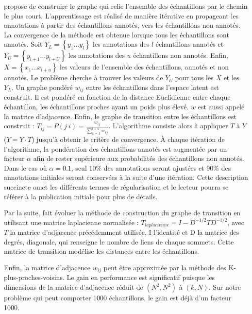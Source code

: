 \cite{zhu_learning_2002} propose de construire le graphe qui relie l'ensemble des échantillons par le chemin le plus court.
L'apprentissage est réalisé de manière itérative en propageant les annotations à partir des échantillons annotés, vers les échantillons non annotés.
La convergence de la méthode est obtenue lorsque tous les échantillons sont annotés.
Soit $Y_{L}=\left\{y_{1} \ldots y_{l}\right\}$ les annotations des $l$ échantillons annotés et $Y_{U}=\left\{y_{l+1} \ldots y_{l+U}\right\}$ les annotations des $u$ échantillons non annotés.
Enfin, $X=\left\{x_{1} \ldots x_{l+u}\right\}$ les valeurs de l'ensemble des échantillons, annotés et non annotés.
Le problème cherche à trouver les valeurs de $Y_{U}$ pour tous les $X$ et les $Y_{L}$.
Un graphe pondéré $w_{ij}$ entre les échantillons dans l'espace latent est construit. Il est pondéré en fonction de la distance Euclidienne entre chaque échantillon, les échantillons proches ayant un poids plus élevé.
$w$ est aussi appelé la matrice d'adjacence.
Enfin, le graphe de transition entre les échantillons est construit : $T_{i j}=P(j \ i)=\frac{w_{i j}}{\sum_{k=1}^{l+u} w_{k j}}$.
L'algorithme consiste alors à appliquer $T$ à $Y$ ($Y = Y \cdot T$) jusqu'à obtenir le critère de convergence.
À chaque itération de l'algorithme, la pondération des échantillons annotés est augmentée par un facteur $\alpha$ afin de rester supérieure aux probabilités des échantillons non annotés.
Dans le cas où $\alpha = 0.1$, seul 10\% des annotations seront ajustées et 90\% des annotations initiales seront conservées à la suite d'une itération.
Cette description succincte omet les différents termes de régularisation et le lecteur pourra se référer à la publication initiale pour plus de détails.

Par la suite, \cite{zhou_learning_2003} fait évoluer la méthode de construction du graphe de transition en utilisant une matrice laplacienne normalisée : $T_{laplacienne} = I - D^{-1/2} T D^{-1/2}$, avec $T$ la matrice d'adjacence précédemment utilisée, I l'identité et D la matrice des degrés, diagonale, qui renseigne le nombre de liens de chaque sommets.
Cette matrice de transition modélise les distances entre les échantillons.

Enfin, la matrice d'adjacence $w_{ij}$ peut être approximée par la méthode des K-plus-proches-voisins.
Le gain en performance est significatif puisque les dimensions de la matrice d'adjacence réduit de $(N^2, N^2)$ à $(k, N)$.
Sur notre problème qui peut comporter 1000 échantillons, le gain est déjà d'un facteur 1000.

